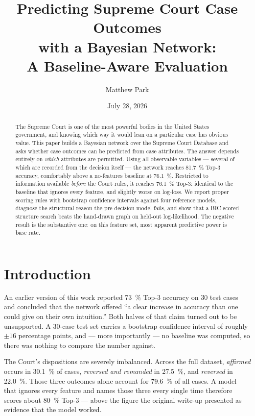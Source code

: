 \documentclass[11pt]{article}
\title{\bfseries Predicting Supreme Court Case Outcomes\\ with a Bayesian Network:\\[0.3em]
\large A Baseline-Aware Evaluation}
\author{Matthew Park}
\date{July 28, 2026}
\begin{document}
\maketitle

\begin{abstract}
\noindent
The Supreme Court is one of the most powerful bodies in the United States
government, and knowing which way it would lean on a particular case has
obvious value. This paper builds a Bayesian network over the Supreme Court
Database and asks whether case outcomes can be predicted from case attributes.
The answer depends entirely on \emph{which} attributes are permitted. Using all
observable variables --- several of which are recorded from the decision itself
--- the network reaches \SI{81.7}{\percent} Top-3 accuracy, comfortably above a
no-features baseline at \SI{76.1}{\percent}. Restricted to information available
\emph{before} the Court rules, it reaches \SI{76.1}{\percent} Top-3: identical
to the baseline that ignores every feature, and slightly worse on log-loss.
We report proper scoring rules with bootstrap confidence intervals against four
reference models, diagnose the structural reason the pre-decision model fails,
and show that a BIC-scored structure search beats the hand-drawn graph on
held-out log-likelihood. The negative result is the substantive one: on this
feature set, most apparent predictive power is base rate.
\end{abstract}

\section{Introduction}

An earlier version of this work reported \SI{73}{\percent} Top-3 accuracy on 30
test cases and concluded that the network offered ``a clear increase in accuracy
than one could give on their own intuition.'' Both halves of that claim turned
out to be unsupported. A 30-case test set carries a bootstrap confidence
interval of roughly $\pm 16$ percentage points, and --- more importantly --- no
baseline was computed, so there was nothing to compare the number against.

The Court's dispositions are severely imbalanced. Across the full dataset,
\emph{affirmed} occurs in \SI{30.1}{\percent} of cases, \emph{reversed and
remanded} in \SI{27.5}{\percent}, and \emph{reversed} in \SI{22.0}{\percent}.
Those three outcomes alone account for \SI{79.6}{\percent} of all cases. A model
that ignores every feature and names those three every single time therefore
scores about \SI{80}{\percent} Top-3 --- above the figure the original write-up
presented as evidence that the model worked.
\end{document}
